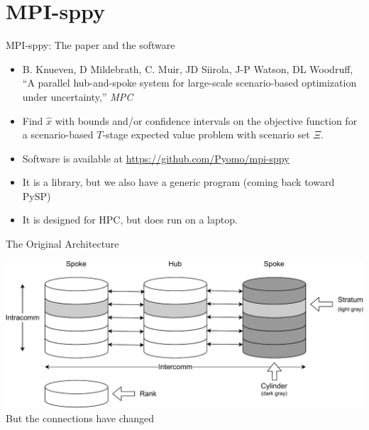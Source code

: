 \documentclass[9pt,usenames,dvipsnames]{beamer}
\begin{document}
\section{MPI-sppy}
\begin{frame}{MPI-sppy: The paper and the software}
\begin{itemize}
\item B. Knueven, D Mildebrath, C. Muir, JD Siirola, J-P Watson, DL Woodruff, ``A parallel hub-and-spoke system for large-scale scenario-based optimization under uncertainty,'' {\em MPC}
\item Find $\hat{x}$ with bounds and/or confidence intervals on the objective function for a scenario-based $T$-stage expected value problem with scenario set $\Xi$.
  \item Software is available at \url{https://github.com/Pyomo/mpi-sppy}
  \item It is a library, but we also have a generic program (coming back toward PySP)
  \item It is designed for HPC, but does run on a laptop.
\end{itemize}
\end{frame}

\begin{frame}{The Original Architecture}
  \subtitle{MPI: Message Passing Interface}

\includegraphics[width=1.0\linewidth]{hubspoke.pdf}
But the connections have changed
\end{frame}
\end{document}
